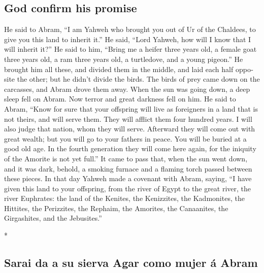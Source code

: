 \begin{paracol}{2}
\begin{otherlanguage}{english}
\hypertarget{god-confirm-his-promise}{%
\subsection{God confirm his promise}\label{god-confirm-his-promise}}

 He said to Abram, ``I am Yahweh who brought you out of Ur
of the Chaldees, to give you this land to inherit it.'' 
He said, ``Lord Yahweh, how will I know that I will inherit it?''
 He said to him, ``Bring me a heifer three years old, a
female goat three years old, a ram three years old, a turtledove, and a
young pigeon.''  He brought him all these, and divided
them in the middle, and laid each half opposite the other; but he didn't
divide the birds.  The birds of prey came down on the
carcasses, and Abram drove them away.  When the sun was
going down, a deep sleep fell on Abram. Now terror and great darkness
fell on him.  He said to Abram, ``Know for sure that your
offspring will live as foreigners in a land that is not theirs, and will
serve them. They will afflict them four hundred years.  I
will also judge that nation, whom they will serve. Afterward they will
come out with great wealth;  but you will go to your
fathers in peace. You will be buried at a good old age. 
In the fourth generation they will come here again, for the iniquity of
the Amorite is not yet full.''  It came to pass that,
when the sun went down, and it was dark, behold, a smoking furnace and a
flaming torch passed between these pieces.  In that day
Yahweh made a covenant with Abram, saying, ``I have given this land to
your offspring, from the river of Egypt to the great river, the river
Euphrates:  the land of the Kenites, the Kenizzites, the
Kadmonites,  the Hittites, the Perizzites, the Rephaim,
 the Amorites, the Canaanites, the Girgashites, and the
Jebusites.''

\end{otherlanguage}

\switchcolumn[0]*

\hypertarget{sarai-da-a-su-sierva-agar-como-mujer-uxe1-abram}{%
\subsection{Sarai da a su sierva Agar como mujer á
Abram}\label{sarai-da-a-su-sierva-agar-como-mujer-uxe1-abram}}


\end{paracol}
